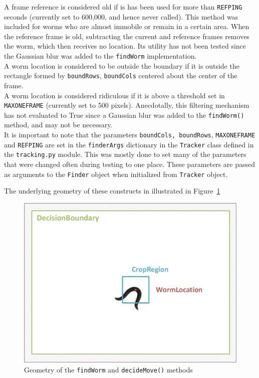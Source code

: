 \documentclass[main.tex]{subfiles}
\begin{document}
A frame reference is considered old if is has been used for more than \verb|REFPING| seconds (currently set to 600,000, and hence never called). This method was included for worms who are almost immobile or remain in a certain area. When the reference frame is old, subtracting the current and reference frames removes the worm, which then receives no location. Its utility has not been tested since the Gaussian blur was added to the \verb|findWorm| implementation. \\

A worm location is considered to be outside the boundary if it is outside the rectangle formed by \verb|boundRows|, \verb|boundCols| centered about the center of the frame. \\

A worm location is considered ridiculous if it is above a threshold set in \verb|MAXONEFRAME| (currently set to 500 pixels). Anecdotally, this filtering mechanism has not evaluated to True since a Gaussian blur was added to the \verb|findWorm()| method, and may not be necessary.\\ 

It is important to note that the parameters \verb|boundCols, boundRows|, \verb|MAXONEFRAME| and \verb|REFPING| are set in the \verb|finderArgs| dictionary in the \verb|Tracker| class defined in the \verb|tracking.py| module. This was mostly done to set many of the parameters that were changed often during testing to one place. These parameters are passed as arguments to the \verb|Finder| object when initialized from \verb|Tracker| object. 



The underlying geometry of these constructs in illustrated in Figure~\ref{fig:geom}

\begin{figure}[!htbp]
  \centering
  \includegraphics[scale = 0.5]{geom}
  \caption{Geometry of the \texttt{findWorm} and \texttt{decideMove()} methods}
  \label{fig:geom}
\end{figure}
\end{document}
